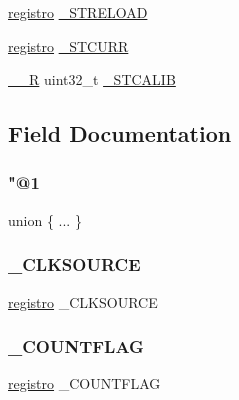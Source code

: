 \begin{DoxyCompactItemize}
\begin{tabbing}
\end{tabbing}\item 
\mbox{\hyperlink{_regs___l_p_c176x_8h_a7834e059ad90540ce735ec41183ff05a}{registro}} \mbox{\hyperlink{structsystick__t_a279043cdd61dfe4d53d83afe4b7ec141}{\+\_\+\+S\+T\+R\+E\+L\+O\+AD}}
\item 
\mbox{\hyperlink{_regs___l_p_c176x_8h_a7834e059ad90540ce735ec41183ff05a}{registro}} \mbox{\hyperlink{structsystick__t_ac51b6f2e44bb5b23e87b49143082786c}{\+\_\+\+S\+T\+C\+U\+RR}}
\item 
\mbox{\hyperlink{_regs___l_p_c176x_8h_aef00c279597b188e4cdd14d288ddf77a}{\+\_\+\+\_\+R}} uint32\+\_\+t \mbox{\hyperlink{structsystick__t_a9b3ccdde1bd6c1c8cbc4ad946c5e76e6}{\+\_\+\+S\+T\+C\+A\+L\+IB}}
\end{DoxyCompactItemize}


\subsection{Field Documentation}
\mbox{\label{structsystick__t_a95b34de3bdfa64036ff74359294675df}} 
\subsubsection{\texorpdfstring{"@1}{@1}}
{\footnotesize\ttfamily union \{ ... \} }

\mbox{\label{structsystick__t_a88332e1fbc3462fcc10913ee99f128b9}} 
\subsubsection{\texorpdfstring{\_CLKSOURCE}{\_CLKSOURCE}}
{\footnotesize\ttfamily \mbox{\hyperlink{_regs___l_p_c176x_8h_a7834e059ad90540ce735ec41183ff05a}{registro}} \+\_\+\+C\+L\+K\+S\+O\+U\+R\+CE}

\mbox{\label{structsystick__t_a64f7505b22e668887fff49359f76721f}} 
\subsubsection{\texorpdfstring{\_COUNTFLAG}{\_COUNTFLAG}}
{\footnotesize\ttfamily \mbox{\hyperlink{_regs___l_p_c176x_8h_a7834e059ad90540ce735ec41183ff05a}{registro}} \+\_\+\+C\+O\+U\+N\+T\+F\+L\+AG}

